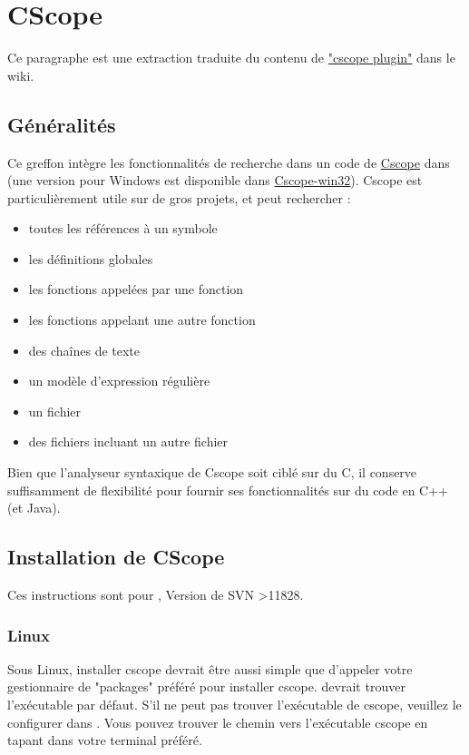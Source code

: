 \section{CScope}\label{sec:cscope}

Ce paragraphe est une extraction traduite du contenu de \href{https://wiki.codeblocks.org/index.php/Cscope_plugin}{"cscope plugin"} dans le wiki.

\subsection{Généralités}

Ce greffon intègre les fonctionnalités de recherche dans un code de \href{https://cscope.sourceforge.net/}{Cscope} dans \codeblocks (une version pour Windows est disponible dans \href{https://code.google.com/p/cscope-win32/}{Cscope-win32}). Cscope est particulièrement utile sur de gros projets, et peut rechercher :

\begin{itemize}[noitemsep]
\item toutes les références à un symbole
\item les définitions globales
\item les fonctions appelées par une fonction
\item les fonctions appelant une autre fonction
\item des chaînes de texte
\item un modèle d'expression régulière
\item un fichier
\item des fichiers incluant un autre fichier
\end{itemize}

Bien que l'analyseur syntaxique de Cscope soit ciblé sur du C, il conserve suffisamment de flexibilité pour fournir ses fonctionnalités sur du code en C++ (et Java).

\subsection{Installation de CScope}

Ces instructions sont pour \codeblocks, Version de SVN \textgreater  11828.

\subsubsection{Linux}

Sous Linux, installer cscope devrait être aussi simple que d'appeler votre gestionnaire de "packages" préféré pour installer cscope. \codeblocks devrait trouver l'exécutable par défaut. S'il ne peut pas trouver l'exécutable de cscope, veuillez le configurer dans . Vous pouvez trouver le chemin vers l'exécutable cscope en tapant  dans votre terminal préféré.

